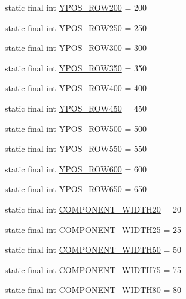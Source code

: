 \begin{DoxyCompactItemize}
\item 
static final int \hyperlink{class_display_1_1_display_af186989bbcc82bddc811ce9727cb1d4d}{Y\+P\+O\+S\+\_\+\+R\+O\+W200} = 200
\item 
static final int \hyperlink{class_display_1_1_display_a76fe305a0d851cc121da69952ee13b00}{Y\+P\+O\+S\+\_\+\+R\+O\+W250} = 250
\item 
static final int \hyperlink{class_display_1_1_display_aaf16f1b813645dc5969d6547d7947b3a}{Y\+P\+O\+S\+\_\+\+R\+O\+W300} = 300
\item 
static final int \hyperlink{class_display_1_1_display_ad479e849d0564e40118e7d76652d9ffa}{Y\+P\+O\+S\+\_\+\+R\+O\+W350} = 350
\item 
static final int \hyperlink{class_display_1_1_display_a30efc4ca7cf960942741ac557862fbc8}{Y\+P\+O\+S\+\_\+\+R\+O\+W400} = 400
\item 
static final int \hyperlink{class_display_1_1_display_a68978a2870b55dbd8b5ab6d93db2ed79}{Y\+P\+O\+S\+\_\+\+R\+O\+W450} = 450
\item 
static final int \hyperlink{class_display_1_1_display_af69167585902297bf72bccb89eac59ad}{Y\+P\+O\+S\+\_\+\+R\+O\+W500} = 500
\item 
static final int \hyperlink{class_display_1_1_display_a18e8f506bdeb1ffce18d4e17eacfc1c9}{Y\+P\+O\+S\+\_\+\+R\+O\+W550} = 550
\item 
static final int \hyperlink{class_display_1_1_display_aeb7358eb4ef9314e129e3636eaee48b2}{Y\+P\+O\+S\+\_\+\+R\+O\+W600} = 600
\item 
static final int \hyperlink{class_display_1_1_display_a60296fc1277e58422d02f8f462ad95c5}{Y\+P\+O\+S\+\_\+\+R\+O\+W650} = 650
\item 
static final int \hyperlink{class_display_1_1_display_af02e2130bca24f14a40c4d5c15712b94}{C\+O\+M\+P\+O\+N\+E\+N\+T\+\_\+\+W\+I\+D\+T\+H20} = 20
\item 
static final int \hyperlink{class_display_1_1_display_ab85e083dbe85ad9eeb62591816ddc962}{C\+O\+M\+P\+O\+N\+E\+N\+T\+\_\+\+W\+I\+D\+T\+H25} = 25
\item 
static final int \hyperlink{class_display_1_1_display_abad2084dbebbb332775a53c5a79fb055}{C\+O\+M\+P\+O\+N\+E\+N\+T\+\_\+\+W\+I\+D\+T\+H50} = 50
\item 
static final int \hyperlink{class_display_1_1_display_a357b313cc7372c3fce2808f738c26369}{C\+O\+M\+P\+O\+N\+E\+N\+T\+\_\+\+W\+I\+D\+T\+H75} = 75
\item 
static final int \hyperlink{class_display_1_1_display_a42b05e8c9ef5a9a34a30dd19412e22e0}{C\+O\+M\+P\+O\+N\+E\+N\+T\+\_\+\+W\+I\+D\+T\+H80} = 80

\end{DoxyCompactItemize}
